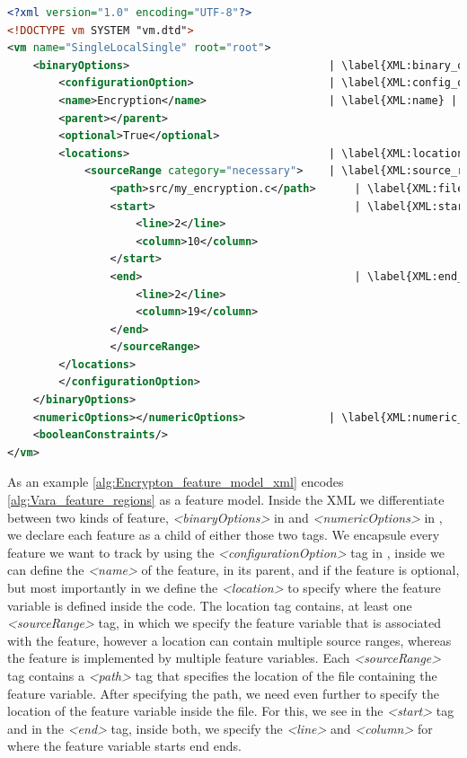 \begin{minipage}{\linewidth}
\begin{lstlisting}[caption={Feature model of \autoref{alg:Vara_feature_regions} in XML},language=XML,label={alg:Encrypton_feature_model_xml},escapechar=|]
<?xml version="1.0" encoding="UTF-8"?>
<!DOCTYPE vm SYSTEM "vm.dtd">
<vm name="SingleLocalSingle" root="root">
    <binaryOptions>                               | \label{XML:binary_option} |
        <configurationOption>                     | \label{XML:config_option} |
        <name>Encryption</name>                   | \label{XML:name} |
        <parent></parent>
        <optional>True</optional>
        <locations>                               | \label{XML:location} |
            <sourceRange category="necessary">    | \label{XML:source_range} |
                <path>src/my_encryption.c</path>      | \label{XML:file_path} |
                <start>                               | \label{XML:start_variable} |
                    <line>2</line>
                    <column>10</column>
                </start>
                <end>                                 | \label{XML:end_variable} |
                    <line>2</line>
                    <column>19</column>
                </end>
                </sourceRange>
        </locations>
        </configurationOption>
    </binaryOptions>
    <numericOptions></numericOptions>             | \label{XML:numeric_option} |
    <booleanConstraints/>
</vm>
\end{lstlisting}
\end{minipage}

As an example \autoref{alg:Encrypton_feature_model_xml} encodes \autoref{alg:Vara_feature_regions} as a feature model. 
Inside the \textsc{XML} we differentiate between two kinds of feature, \emph{<binaryOptions>} in  and \emph{<numericOptions>} in 
, we declare each feature as a child of either those two tags. We encapsule every feature we want to 
track by using the \emph{<configurationOption>} tag in , inside we can define the \emph{<name>} of the feature, in 
its parent, and if the feature is optional, but most importantly in  we define the \emph{<location>} to specify
where the feature variable is defined inside the code.
The location tag contains, at least one \emph{<sourceRange>} tag, in which we specify the feature variable that is associated with the feature, 
however a location can contain multiple source ranges, whereas the feature is implemented by multiple feature variables.
Each \emph{<sourceRange>} tag contains a \emph{<path>} tag that specifies the location of the file containing the feature variable.
After specifying the path, we need even further to specify the location of the feature variable inside the file. 
For this, we see in  the \emph{<start>} tag and in  the \emph{<end>} tag, 
inside both, we specify the \emph{<line>} and \emph{<column>} for where the feature variable starts end ends. 

